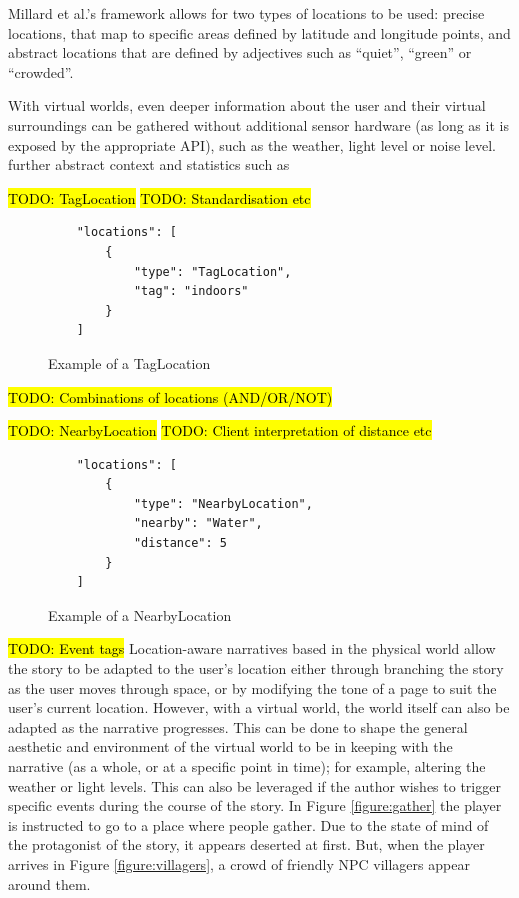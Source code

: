 \documentclass{acm}
\newcommand{\TODO}[1]{\hl{TODO: #1}}
\begin{document}
Millard et al.'s framework allows for two types of locations to be used: precise locations, that map to specific areas defined by latitude and longitude points, and abstract locations that are defined by adjectives such as ``quiet'', ``green'' or ``crowded''.

With virtual worlds, even deeper information about the user and their virtual surroundings can be gathered without additional sensor hardware (as long as it is exposed by the appropriate API), such as the weather, light level or noise level.
further abstract context and statistics such as

\TODO{TagLocation}
\TODO{Standardisation etc}
\begin{figure}
\centering
\begin{verbatim}
    "locations": [
        {
            "type": "TagLocation",
            "tag": "indoors"
        }
    ]
\end{verbatim}

\caption{Example of a TagLocation}
\label{figure:taglocation}
\end{figure}
\TODO{Combinations of locations (AND/OR/NOT)}

\TODO{NearbyLocation}
\TODO{Client interpretation of distance etc}
\begin{figure}
\centering
\begin{verbatim}
    "locations": [
        {
            "type": "NearbyLocation",
            "nearby": "Water",
            "distance": 5
        }
    ]
\end{verbatim}

\caption{Example of a NearbyLocation}
\label{figure:nearbylocation}
\end{figure}


\TODO{Event tags}
Location-aware narratives based in the physical world allow the story to be adapted to the user's location either through branching the story as the user moves through space, or by modifying the tone of a page to suit the user's current location. However, with a virtual world, the world itself can also be adapted as the narrative progresses. This can be done to shape the general aesthetic and environment of the virtual world to be in keeping with the narrative (as a whole, or at a specific point in time); for example, altering the weather or light levels.  This can also be leveraged if the author wishes to trigger specific events during the course of the story. In Figure \ref{figure:gather} the player is instructed to go to a place where people gather. Due to the state of mind of the protagonist of the story, it appears deserted at first. But, when the player arrives in Figure \ref{figure:villagers}, a crowd of friendly NPC villagers appear around them.
\end{document}
